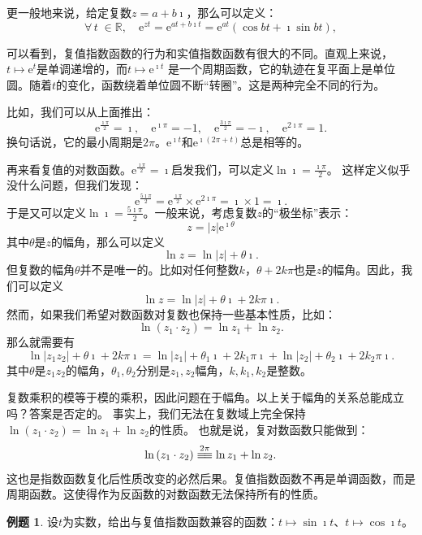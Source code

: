 \documentclass[12pt,UTF8]{ctexbook}
\newcommand{\e}{\mathrm{e}}
\newcommand{\tong}[1]{\overset{#1}{\equiv\joinrel\equiv}}
\theoremstyle{definition}
\newtheorem{et}{例题}[section]
\theoremstyle{plain}
\begin{document}
更一般地来说，给定复数$z = a + b\imath$，那么可以定义：
$$ \forall \, t \; \in \mathbb{R}, \quad  \e^{z t} = \e^{at + b\imath t} = \e^{at} \left( \cos{bt} + \imath \sin{bt} \right), $$

可以看到，复值指数函数的行为和实值指数函数有很大的不同。直观上来说，$t\mapsto \e^{t}$是单调递增的，而$t\mapsto \e^{\imath t}$
是一个周期函数，它的轨迹在复平面上是单位圆。随着$t$的变化，函数绕着单位圆不断“转圈”。这是两种完全不同的行为。

比如，我们可以从上面推出：
$$ \e^{\frac{\imath\pi}{2}} = \imath, \quad \e^{\imath\pi} = -1, \quad \e^{\frac{3\imath\pi}{2}} = -\imath, \quad \e^{2\imath\pi} = 1. $$
换句话说，它的最小周期是$2\pi$。$\e^{\imath t}$和$\e^{\imath(2\pi + t)}$总是相等的。

再来看复值的对数函数。$\e^{\frac{\imath\pi}{2}} = \imath$启发我们，可以定义$\ln{\imath} = \frac{\imath\pi}{2}$。
这样定义似乎没什么问题，但我们发现：
$$ \e^{\frac{5\imath\pi}{2}} = \e^{\frac{\imath\pi}{2}} \times \e^{2\imath\pi} = \imath \times 1 = \imath. $$
于是又可以定义$\ln{\imath} = \frac{5\imath\pi}{2}$。一般来说，考虑复数$z$的“极坐标”表示：
$$ z = |z| \e^{\imath \theta}$$
其中$\theta$是$z$的幅角，那么可以定义
$$\ln{z} = \ln{|z|} + \theta \imath.$$
但复数的幅角$\theta$并不是唯一的。比如对任何整数$k$，$\theta + 2k\pi$也是$z$的幅角。因此，我们可以定义
$$\ln{z} = \ln{|z|} + \theta \imath + 2k\pi\imath.$$
然而，如果我们希望对数函数对复数也保持一些基本性质，比如：
$$ \ln{(z_1 \cdot z_2)} = \ln{z_1} + \ln{z_2}. $$
那么就需要有
$$ \ln{|z_1z_2|} + \theta \imath + 2k\pi\imath = \ln{|z_1|} + \theta_1 \imath + 2k_1\pi\imath + \ln{|z_2|} + \theta_2 \imath + 2k_2\pi\imath.$$
其中$\theta$是$z_1z_2$的幅角，$\theta_1, \theta_2$分别是$z_1, z_2$幅角，$k, k_1, k_2$是整数。

复数乘积的模等于模的乘积，因此问题在于幅角。以上关于幅角的关系总能成立吗？答案是否定的。
事实上，我们无法在复数域上完全保持$\ln{(z_1 \cdot z_2)} = \ln{z_1} + \ln{z_2}$的性质。
也就是说，复对数函数只能做到：
$$ \ln{(z_1 \cdot z_2)} \tong{2\pi} \ln{z_1} + \ln{z_2} . $$
这也是指数函数复化后性质改变的必然后果。复值指数函数不再是单调函数，而是周期函数。这使得作为反函数的对数函数无法保持所有的性质。

\begin{et}
    设$t$为实数，给出与复值指数函数兼容的函数：$t\mapsto \sin{\imath t}$、$t\mapsto \cos{\imath t}$。
\end{et}
\end{document}
